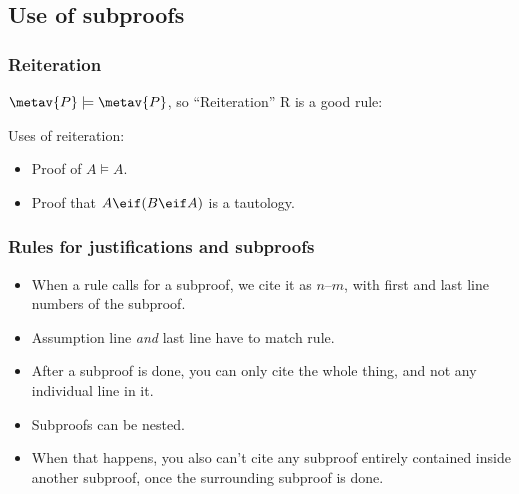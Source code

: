 \subsection{Use of subproofs}

\begin{frame}
  \frametitle{Reiteration}

  $\metav{P} \models \metav{P}$, so ``Reiteration'' R is a good rule:

  \begin{fitchproof}
     
  \end{fitchproof}

  Uses of reiteration:
  \begin{itemize}[<+->]
    \item Proof of $A \models A$.
    \item Proof that $A \eif (B \eif A)$ is a tautology.
  \end{itemize}
\end{frame}

\begin{frame}
  \begin{fitchproof}
    \open
    \close
  \end{fitchproof}
\end{frame}

\begin{frame}
  \begin{fitchproof}
    \open
    \open
    \close
    \close
  \end{fitchproof}
\end{frame}


\newhourlecture

\begin{frame}
  \frametitle{Rules for justifications and subproofs}

  \begin{itemize}[<+->]
    \item When a rule calls for a subproof, we cite it as $n$--$m$,
    with first and last line numbers of the subproof.
    \item Assumption line \emph{and} last line have to match rule.
    \item After a subproof is done, you can only cite the whole thing,
    and not any individual line in it.
    \item Subproofs can be nested.
    \item When that happens, you also can't cite any subproof entirely
    contained inside another subproof, once the surrounding subproof
    is done.
  \end{itemize}
\end{frame}

